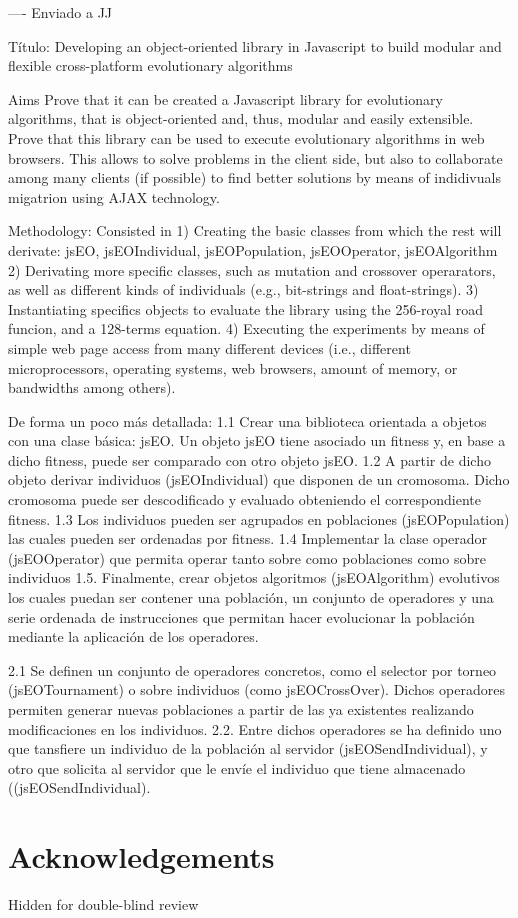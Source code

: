 \documentclass{llncs}
\begin{document}
----
Enviado a JJ

Título:
Developing an object-oriented library in Javascript to build modular and flexible cross-platform evolutionary algorithms 

Aims
Prove that it can be created a Javascript library for evolutionary algorithms, that is object-oriented and, thus, modular and easily extensible.
Prove that this library can be used to execute evolutionary algorithms in web browsers. This allows to solve problems in the client side, but also to collaborate among many clients (if possible) to find better solutions by means of indidivuals migatrion using AJAX technology.

Methodology:
Consisted in
1) Creating the basic classes from which the rest will derivate: jsEO, jsEOIndividual, jsEOPopulation, jsEOOperator, jsEOAlgorithm
2) Derivating more specific classes, such as mutation and crossover operarators, as well as different kinds of individuals (e.g., bit-strings and float-strings).
3) Instantiating specifics objects to evaluate the library using the 256-royal road funcion, and a 128-terms equation.
4) Executing the experiments by means of simple web page access from many different devices (i.e., different microprocessors, operating systems, web browsers, amount of memory, or bandwidths among others).




De forma un poco más detallada:
1.1 Crear una biblioteca orientada a objetos con una clase básica: jsEO. Un objeto jsEO tiene asociado un fitness y, en base a dicho fitness, puede ser comparado con otro objeto jsEO.
1.2 A partir de dicho objeto derivar individuos (jsEOIndividual) que disponen de un cromosoma. Dicho cromosoma puede ser descodificado y evaluado obteniendo el correspondiente fitness.
1.3 Los individuos pueden ser agrupados en poblaciones (jsEOPopulation) las cuales pueden ser ordenadas por fitness.
1.4 Implementar la clase operador (jsEOOperator) que permita operar tanto sobre como poblaciones como sobre individuos
1.5. Finalmente, crear objetos algoritmos (jsEOAlgorithm) evolutivos los cuales puedan ser contener una población, un conjunto de operadores y una serie ordenada de instrucciones que permitan hacer evolucionar la población mediante la aplicación de los operadores.

2.1 Se definen un conjunto de operadores concretos, como el selector por torneo (jsEOTournament) o sobre individuos (como jsEOCrossOver). Dichos operadores permiten generar nuevas poblaciones a partir de las ya existentes realizando modificaciones en los individuos. 
2.2. Entre dichos operadores se ha definido uno que tansfiere un individuo de la población al servidor (jsEOSendIndividual), y otro que solicita al servidor que le envíe el individuo que tiene almacenado ((jsEOSendIndividual).

\section*{Acknowledgements}

Hidden for double-blind review




\end{document}
